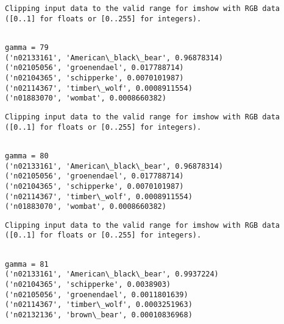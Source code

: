 \documentclass[11pt]{article}
\begin{document}
    \begin{Verbatim}[commandchars=\\\{\}]
Clipping input data to the valid range for imshow with RGB data ([0..1] for floats or [0..255] for integers).

    \end{Verbatim}

    \begin{Verbatim}[commandchars=\\\{\}]

gamma = 79
('n02133161', 'American\_black\_bear', 0.96878314)
('n02105056', 'groenendael', 0.017788714)
('n02104365', 'schipperke', 0.0070101987)
('n02114367', 'timber\_wolf', 0.0008911554)
('n01883070', 'wombat', 0.0008660382)

    \end{Verbatim}

    \begin{Verbatim}[commandchars=\\\{\}]
Clipping input data to the valid range for imshow with RGB data ([0..1] for floats or [0..255] for integers).

    \end{Verbatim}

    \begin{Verbatim}[commandchars=\\\{\}]

gamma = 80
('n02133161', 'American\_black\_bear', 0.96878314)
('n02105056', 'groenendael', 0.017788714)
('n02104365', 'schipperke', 0.0070101987)
('n02114367', 'timber\_wolf', 0.0008911554)
('n01883070', 'wombat', 0.0008660382)

    \end{Verbatim}

    \begin{Verbatim}[commandchars=\\\{\}]
Clipping input data to the valid range for imshow with RGB data ([0..1] for floats or [0..255] for integers).

    \end{Verbatim}

    \begin{Verbatim}[commandchars=\\\{\}]

gamma = 81
('n02133161', 'American\_black\_bear', 0.9937224)
('n02104365', 'schipperke', 0.0038903)
('n02105056', 'groenendael', 0.0011801639)
('n02114367', 'timber\_wolf', 0.0003251963)
('n02132136', 'brown\_bear', 0.00010836968)

    \end{Verbatim}
\end{document}
